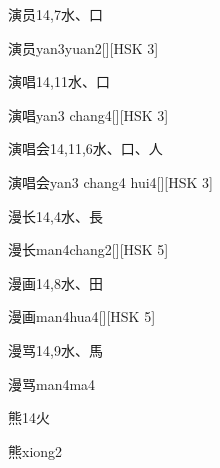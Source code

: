 \begin{entry}{演员}{14,7}{⽔、⼝}
  \begin{phonetics}{演员}{yan3yuan2}[][HSK 3]
  \end{phonetics}
\end{entry}

\begin{entry}{演唱}{14,11}{⽔、⼝}
  \begin{phonetics}{演唱}{yan3 chang4}[][HSK 3]
  \end{phonetics}
\end{entry}

\begin{entry}{演唱会}{14,11,6}{⽔、⼝、⼈}
  \begin{phonetics}{演唱会}{yan3 chang4 hui4}[][HSK 3]
  \end{phonetics}
\end{entry}

\begin{entry}{漫长}{14,4}{⽔、⾧}
  \begin{phonetics}{漫长}{man4chang2}[][HSK 5]
  \end{phonetics}
\end{entry}

\begin{entry}{漫画}{14,8}{⽔、⽥}
  \begin{phonetics}{漫画}{man4hua4}[][HSK 5]
  \end{phonetics}
\end{entry}

\begin{entry}{漫骂}{14,9}{⽔、⾺}
  \begin{phonetics}{漫骂}{man4ma4}
  \end{phonetics}
\end{entry}

\begin{entry}{熊}{14}{⽕}
  \begin{phonetics}{熊}{xiong2}
  \end{phonetics}
\end{entry}

